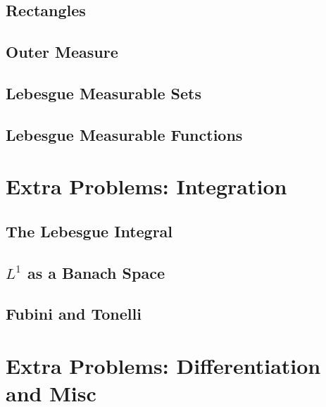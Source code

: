 \hypertarget{rectangles}{%
\subsection{Rectangles}\label{rectangles}}

\hypertarget{outer-measure-1}{%
\subsection{Outer Measure}\label{outer-measure-1}}

\hypertarget{lebesgue-measurable-sets}{%
\subsection{Lebesgue Measurable Sets}\label{lebesgue-measurable-sets}}

\hypertarget{lebesgue-measurable-functions}{%
\subsection{Lebesgue Measurable
Functions}\label{lebesgue-measurable-functions}}

\hypertarget{extra-problems-integration}{%
\section{Extra Problems: Integration}\label{extra-problems-integration}}

\hypertarget{the-lebesgue-integral}{%
\subsection{The Lebesgue Integral}\label{the-lebesgue-integral}}

\hypertarget{l1-as-a-banach-space}{%
\subsection{\texorpdfstring{\(L^1\) as a Banach
Space}{L\^{}1 as a Banach Space}}\label{l1-as-a-banach-space}}

\hypertarget{fubini-and-tonelli}{%
\subsection{Fubini and Tonelli}\label{fubini-and-tonelli}}

\hypertarget{extra-problems-differentiation-and-misc}{%
\section{Extra Problems: Differentiation and
Misc}\label{extra-problems-differentiation-and-misc}}

